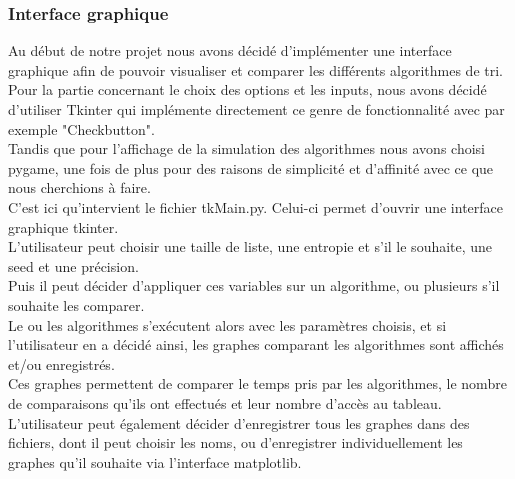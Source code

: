 \documentclass[10pt,a4paper]{article}
\begin{document}
        

        
        \subsubsection{Interface graphique}
        Au début de notre projet nous avons décidé d'implémenter une interface graphique afin de pouvoir visualiser et comparer les différents algorithmes de tri.\\
        Pour la partie concernant le choix des options et les inputs, nous avons décidé d'utiliser Tkinter qui implémente directement ce genre de fonctionnalité avec par exemple "Checkbutton".\\
        Tandis que pour l'affichage de la simulation des algorithmes nous avons choisi pygame, une fois de plus pour des raisons de simplicité et d'affinité avec ce que nous cherchions à faire.\\
        C'est ici qu'intervient le fichier tkMain.py. Celui-ci permet d'ouvrir une interface graphique tkinter. \\ L'utilisateur peut choisir une taille de liste, une entropie et s'il le souhaite, une seed et une précision.\\
        Puis il peut décider d'appliquer ces variables sur un algorithme, ou plusieurs s'il souhaite les comparer.\\
        Le ou les algorithmes s'exécutent alors avec les paramètres choisis, et si l'utilisateur en a décidé ainsi, les graphes comparant les algorithmes sont affichés et/ou enregistrés.\\
        Ces graphes permettent de comparer le temps pris par les algorithmes, le nombre de comparaisons qu'ils ont effectués et leur nombre d'accès au tableau.\\
        L'utilisateur peut également décider d'enregistrer tous les graphes dans des fichiers, dont il peut choisir les noms, ou d'enregistrer individuellement les graphes qu'il souhaite via l'interface matplotlib.\\
        
      
        
\end{document}
